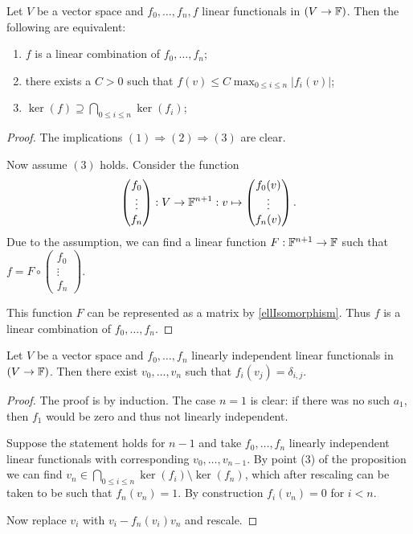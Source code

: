 \begin{lemma} \label{linearDependenceLinearFunctionals}
Let $V$ be a vector space and $f_0,\ldots, f_n, f$ linear functionals in $(V\to \mathbb{F})$. Then the following are equivalent:
\begin{enumerate}
\item $f$ is a linear combination of $f_0,\ldots, f_n$;
\item there exists a $C>0$ such that $f(v) \leq C \max_{0\leq i\leq n}|f_i(v)|$;
\item $\ker(f) \supseteq \bigcap_{0\leq i \leq n}\ker(f_i)$;
\end{enumerate}
\end{lemma}
\begin{proof}
The implications $(1) \Rightarrow (2) \Rightarrow (3)$ are clear.

Now assume $(3)$ holds. Consider the function
\[ \begin{pmatrix}
f_0 \\ \vdots \\ f_n
\end{pmatrix}: V\to \mathbb{F}^{n+1}: v\mapsto \begin{pmatrix}
f_0(v) \\ \vdots \\ f_n(v)
\end{pmatrix}. \]
Due to the assumption, we can find a linear function $F: \mathbb{F}^{n+1}\to \mathbb{F}$ such that $f = F\circ \begin{pmatrix}
f_0 \\ \vdots \\ f_n
\end{pmatrix}$.

This function $F$ can be represented as a matrix by \ref{ellIsomorphism}. Thus $f$ is a linear combination of $f_0,\ldots, f_n$.
\end{proof}
\begin{corollary}
Let $V$ be a vector space and $f_0,\ldots, f_n$ linearly independent linear functionals in $(V\to \mathbb{F})$. Then there exist $v_0, \ldots, v_n$ such that $f_i(v_j) = \delta_{i,j}$.
\end{corollary}
\begin{proof}
The proof is by induction. The case $n=1$ is clear: if there was no such $a_1$, then $f_1$ would be zero and thus not linearly independent.

Suppose the statement holds for $n-1$ and take $f_0,\ldots, f_n$ linearly independent linear functionals with corresponding $v_0,\ldots, v_{n-1}$. By point (3) of the proposition we can find $v_n \in \bigcap_{0\leq i \leq n}\ker(f_i)\setminus \ker(f_n)$, which after rescaling can be taken to be such that $f_n(v_n) = 1$. By construction $f_i(v_n) = 0$ for $i<n$.

Now replace $v_i$ with $v_i-f_n(v_i)v_n$ and rescale.
\end{proof}

